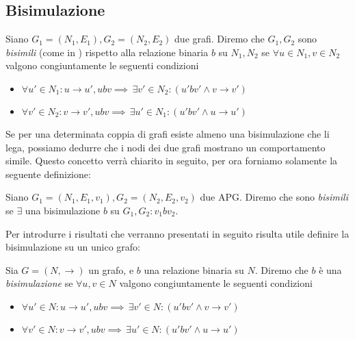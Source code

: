 \subsection{Bisimulazione}
\begin{definition}
    Siano $G_1 = (N_1, E_1), G_2 = (N_2, E_2)$ due grafi. Diremo che $G_1, G_2$ sono \textit{bisimili} (come in \cite{dovier}) rispetto alla relazione binaria $b$ su $N_1, N_2$ se $\forall u \in N_1, v \in N_2$ valgono congiuntamente le seguenti condizioni
    \begin{itemize}
        \item $\forall u' \in N_1 : u \to u', u b v \implies \,\exists v' \in N_2 : (u' b v' \land v \to v')$
        \item $\forall v' \in N_2 : v \to v', u b v \implies \,\exists u' \in N_1 : (u' b v' \land u \to u')$
    \end{itemize}
\end{definition}
Se per una determinata coppia di grafi esiste almeno una bisimulazione che li lega, possiamo dedurre che i nodi dei due grafi mostrano un comportamento simile.
Questo concetto verrà chiarito in seguito, per ora forniamo solamente la seguente definizione:
\begin{definition}
    Siano $G_1 = (N_1, E_1, v_1), G_2 = (N_2, E_2, v_2)$ due APG. Diremo che sono \textit{bisimili} se $\exists$ una bisimulazione $b$ su $G_1, G_2 : v_1 b v_2$.
\end{definition}
Per introdurre i risultati che verranno presentati in seguito risulta utile definire la bisimulazione su un unico grafo:
\begin{definition}
    Sia $G = (N, \to)$ un grafo, e $b$ una relazione binaria su $N$. Diremo che $b$ è una \textit{bisimulazione} se $\forall u,v \in N$ valgono congiuntamente le seguenti condizioni
    \begin{itemize}
        \item $\forall u' \in N : u \to u', u b v \implies \,\exists v' \in N : (u' b v' \land v \to v')$
        \item $\forall v' \in N : v \to v', u b v \implies \,\exists u' \in N : (u' b v' \land u \to u')$
    \end{itemize}
\end{definition}


